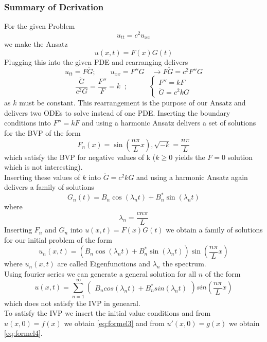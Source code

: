 \subsubsection{Summary of Derivation}
For the given Problem
\[ u_{tt}=c^2u_{xx}\]
we make the Ansatz
\[u(x,t)=F(x)G(t)\]
Plugging this into the given PDE and rearranging delivers
\[u_{tt}=F\ddot{G};\qquad u_{xx}=F''G \quad \rightarrow F\ddot{G}=c^2F''G\]
\[\frac{\ddot{G}}{c^2G}=\frac{F''}{F}=k\;\; ;\qquad\quad\begin{cases} F''=kF\\
\ddot{G}=c^2kG
\end{cases}\]
as $k$ must be constant. This rearrangement is the purpose of our Ansatz and delivers two ODEs to solve instead of one PDE.
Inserting the boundary conditions into $F''=kF$ and using a harmonic Ansatz delivers a set of solutions for the BVP of the form
\[F_n (x)=\sin{\left( \frac{n \pi}{L} x \right) }, \sqrt{-k}=\frac{n \pi}{L}\]
which satisfy the BVP for negative values of k ($k \ge 0$ yields the $F=0$ solution which is not interesting).\\
Inserting these values of $k$ into $\ddot{G}=c^2kG$ and using a harmonic Ansatz again delivers a family of solutions
\[G_n (t) =  B_n \cos{(\lambda_{n} t)} + B_n^* \sin{(\lambda_{n}t)}\]
where 
\[ \lambda_{n} = \frac{c n \pi}{L} \] 
Inserting $F_n$ and $G_n$ into $u(x,t)=F(x)G(t)$ we obtain a family of solutions for our initial problem of the form
\[u_n (x, t) = (B_n \cos{(\lambda_{n} t)} + B_n^* \sin{(\lambda_{n}t)})\sin{\left( \frac{n \pi}{L} x \right) } \]
where $u_n (x, t)$ are called Eigenfunctions and $\lambda_n$ the spectrum.\\
Using fourier series we can generate a general solution for all $n$ of the form
\[u(x,t)=\sum\limits_{n=1}^{\infty}\begin{pmatrix}
    B_n cos(\lambda _n t)+B_n^* sin(\lambda_n t)
    \end{pmatrix} sin\left(\frac{n \pi}{L}x \right) \]
which does not satisfy the IVP in genearal.\\
To satisfy the IVP we insert the initial value conditions and from $u(x,0)=f(x)$ we obtain \ref*{eq:formel3} and from $u'(x,0)=g(x)$ we obtain \ref*{eq:formel4}.

















